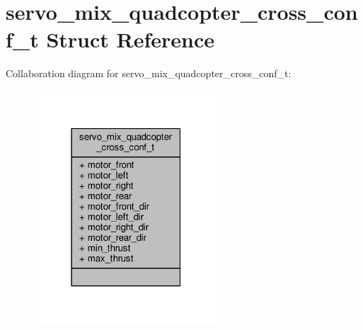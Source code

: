 \hypertarget{structservo__mix__quadcopter__cross__conf__t}{\section{servo\+\_\+mix\+\_\+quadcopter\+\_\+cross\+\_\+conf\+\_\+t Struct Reference}
\label{structservo__mix__quadcopter__cross__conf__t}
}


Collaboration diagram for servo\+\_\+mix\+\_\+quadcopter\+\_\+cross\+\_\+conf\+\_\+t\+:
\nopagebreak
\begin{figure}[H]
\begin{center}
\leavevmode
\includegraphics[width=195pt]{structservo__mix__quadcopter__cross__conf__t__coll__graph}
\end{center}
\end{figure}

